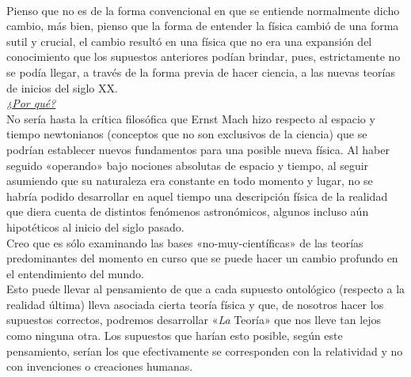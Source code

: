 \documentclass{article}
\begin{document}
 \\
Pienso que no es de la forma convencional en que se entiende normalmente dicho cambio, más bien, pienso que la forma de entender la física cambió de una forma sutil y crucial, el cambio resultó en una física que no era una expansión del conocimiento que los supuestos anteriores podían brindar, pues, estrictamente no se podía llegar, a través de la forma previa de hacer ciencia, a las nuevas teorías de inicios del siglo XX. \\
\underline{\emph{¿Por qué?}} \\
No sería hasta la crítica filosófica que Ernst Mach hizo respecto al espacio y tiempo newtonianos (conceptos que no son exclusivos de la ciencia) que se podrían establecer nuevos fundamentos para una posible nueva física. Al haber seguido «operando» bajo nociones absolutas de espacio y tiempo, al seguir asumiendo que su naturaleza era constante en todo momento y lugar, no se habría podido desarrollar en aquel tiempo una descripción física de la realidad que diera cuenta de distintos fenómenos astronómicos, algunos incluso aún hipotéticos al inicio del siglo pasado. \\
Creo que es sólo examinando las bases «no-muy-científicas» de las teorías predominantes del momento en curso que se puede hacer un cambio profundo en el entendimiento del mundo. \\
Esto puede llevar al pensamiento de que a cada supuesto ontológico (respecto a la realidad última) lleva asociada cierta teoría física y que, de nosotros hacer los supuestos correctos, podremos desarrollar «\emph{La} Teoría» que nos lleve tan lejos como ninguna otra. Los supuestos que harían esto posible, según este pensamiento, serían los que efectivamente se corresponden con la relatividad y no con invenciones o creaciones humanas. \\
\end{document}
